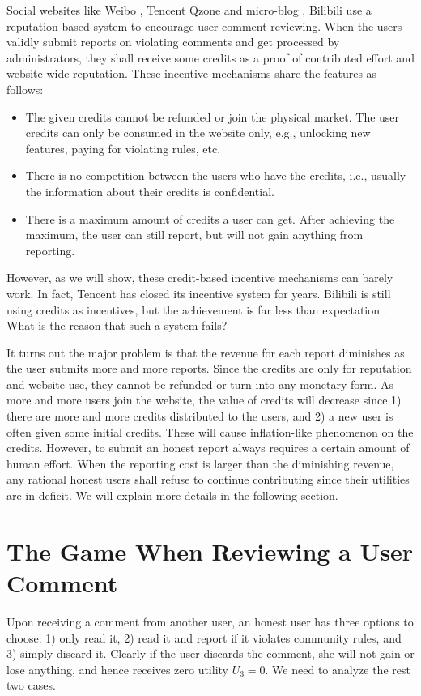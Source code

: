\documentclass[12pt]{article}
\begin{document}
Social websites like Weibo \cite{WB}, Tencent Qzone \cite{QZ} and micro-blog \cite{TMB}, Bilibili \cite{BL} use a reputation-based system to encourage user comment reviewing.
When the users validly submit reports on violating comments and get processed by administrators, they shall receive some credits as a proof of contributed effort and website-wide reputation. These incentive mechanisms share the features as follows:
\begin{itemize}
\item The given credits cannot be refunded or join the physical market. The user credits can only be consumed in the website only, e.g., unlocking new features, paying for violating rules, etc.
\item There is no competition between the users who have the credits, i.e., usually the information about their credits is confidential.
\item There is a maximum amount of credits a user can get. After achieving the maximum, the user can still report, but will not gain anything from reporting.
\end{itemize}
However, as we will show, these credit-based incentive mechanisms can barely work. In fact, Tencent has closed its incentive system for years. Bilibili is still using credits as incentives, but the achievement is far less than expectation \cite{ZH16}. What is the reason that such a system fails?

It turns out the major problem is that the revenue for each report diminishes as the user submits more and more reports. Since the credits are only for reputation and website use, they cannot be refunded or turn into any monetary form. As more and more users join the website, the value of credits will decrease since 1) there are more and more credits distributed to the users, and 2) a new user is often given some initial credits. These will cause inflation-like phenomenon on the credits. However, to submit an honest report always requires a certain amount of human effort. When the reporting cost is larger than the diminishing revenue, any rational honest users shall refuse to continue contributing since their utilities are in deficit. We will explain more details in the following section.

\section{The Game When Reviewing a User Comment}
Upon receiving a comment from another user, an honest user has three options to choose: 1) only read it, 2) read it and report if it violates community rules, and 3) simply discard it. Clearly if the user discards the comment, she will not gain or lose anything, and hence receives zero utility $U_3 = 0$. We need to analyze the rest two cases.
\end{document}
